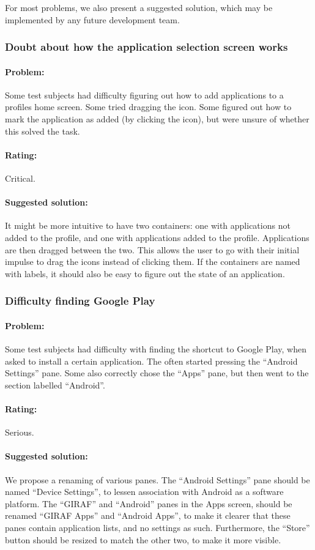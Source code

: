For most problems, we also present a suggested solution, which may be implemented by any future development team.

\subsubsection{Doubt about how the application selection screen works}

\paragraph{Problem:} Some test subjects had difficulty figuring out how to add applications to a profiles home screen. Some tried dragging the icon. Some figured out how to mark the application as added (by clicking the icon), but were unsure of whether this solved the task.
\paragraph{Rating:} Critical.
\paragraph{Suggested solution:} It might be more intuitive to have two containers: one with applications not added to the profile, and one with applications added to the profile. Applications are then dragged between the two. This allows the user to go with their initial impulse to drag the icons instead of clicking them. If the containers are named with labels, it should also be easy to figure out the state of an application.

\subsubsection{Difficulty finding Google Play}

\paragraph{Problem:} Some test subjects had difficulty with finding the shortcut to Google Play, when asked to install a certain application. The often started pressing the ``Android Settings'' pane. Some also correctly chose the ``Apps'' pane, but then went to the section labelled ``Android''. 
\paragraph{Rating:} Serious.
\paragraph{Suggested solution:} We propose a renaming of various panes. The ``Android Settings'' pane should be named ``Device Settings'', to lessen association with Android as a software platform. The ``GIRAF'' and ``Android'' panes in the Apps screen, should be renamed ``GIRAF Apps'' and ``Android Apps'', to make it clearer that these panes contain application lists, and no settings as such. Furthermore, the ``Store'' button should be resized to match the other two, to make it more visible.

